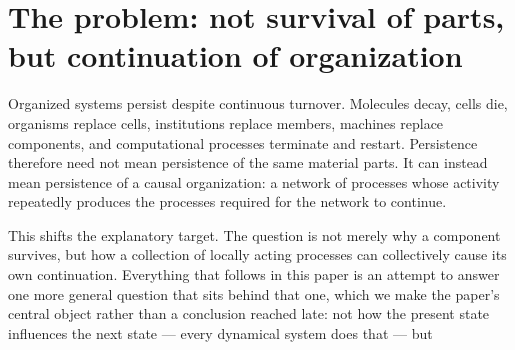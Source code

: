\documentclass[11pt]{article}
\begin{document}
\begin{abstract}
We formalize the common object as a finite-horizon accessibility kernel
\(\mathcal A_T(S\mid\theta,z,E,q)\): the probability that a persistent
successor organization in a set \(S\) is realized within time \(T\),
conditional on current organization \(\theta\), its realized dynamical
state \(z\), external environment \(E\), and the variant-generating
mechanism \(q\). The mechanisms are mathematically distinct but share
one structure: realized organization changes this kernel. It can change
\textbf{what can remain}, \textbf{where future search begins and how
many exploratory trials occur}, and \textbf{how candidate successors are
generated}. This does not imply a force toward complexity or
monotonically increasing organization. Accessibility may narrow as well
as expand, and retained structures may be maladaptive. The framework
instead provides a non-teleological route by which previous viability
can become historically consequential: previous solutions can become
part of the conditions from which subsequent solutions are generated.
The central claim is therefore not that existence makes every future
existence easier, but that \textbf{existence changes what existence can
follow}; cumulative organization is the special case in which enough
previous viability is retained that subsequent viable states need not
repeatedly be reconstructed from scratch.
\end{abstract}

\section{The problem: not survival of parts, but continuation of
organization}
Organized systems persist despite continuous turnover. Molecules decay,
cells die, organisms replace cells, institutions replace members,
machines replace components, and computational processes terminate and
restart. Persistence therefore need not mean persistence of the same
material parts. It can instead mean persistence of a causal
organization: a network of processes whose activity repeatedly produces
the processes required for the network to continue.

This shifts the explanatory target. The question is not merely why a
component survives, but how a collection of locally acting processes can
collectively cause its own continuation. Everything that follows in this
paper is an attempt to answer one more general question that sits behind
that one, which we make the paper's central object rather than a
conclusion reached late: not how the present state influences the next
state --- every dynamical system does that --- but
\end{document}
